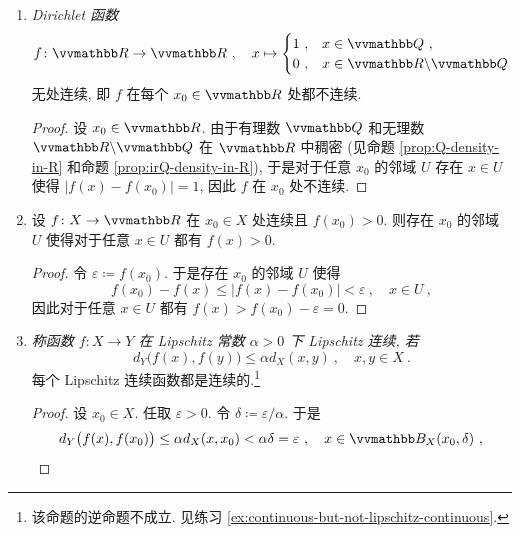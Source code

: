 \begin{example}
\begin{enumerate}
\begin{proof}
            设 \(x_0 \in \Z\). 由于
            \[
                \bigl|\lfloor x \rfloor - \lfloor x_0 \rfloor\bigr| = \lfloor x_0 \rfloor - \lfloor x \rfloor \geq 1\ ,\quad x < x_0\ ,
            \]
            因此对于任意 \(\delta > 0\) 存在 \(x \in (x_0 - \delta, x_0 + \delta)\) 使得 \(\bigl|\lfloor x \rfloor - \lfloor x_0 \rfloor\bigr| \geq 1\). 这说明 \(\lfloor \cdot \rfloor\) 在 \(x_0\) 处不连续.
        \end{proof}
        \item \textsl{Dirichlet 函数
        \[
            f \colon \R \to \R\ ,\quad x \mapsto
            \begin{cases}
                1\ , & x \in \Q\ , \\
                0\ , & x \in \R \backslash \Q
            \end{cases}
        \]
        } 无处连续, 即 \(f\) 在每个 \(x_0 \in \R\) 处都不连续.
        \begin{proof}
            设 \(x_0 \in \R\). 由于有理数 \(\Q\) 和无理数 \(\R \backslash \Q\) 在 \(\R\) 中稠密 (见命题 \ref{prop:Q-density-in-R} 和命题 \ref{prop:irQ-density-in-R}), 于是对于任意 \(x_0\) 的邻域 \(U\) 存在 \(x \in U\) 使得 \(|f(x) - f(x_0)| = 1\), 因此 \(f\) 在 \(x_0\) 处不连续.
        \end{proof}
        \item 设 \(f \colon X \to \R\) 在 \(x_0 \in X\) 处连续且 \(f(x_0) > 0\). 则存在 \(x_0\) 的邻域 \(U\) 使得对于任意 \(x \in U\) 都有 \(f(x) > 0\).
        \begin{proof}
            令 \(\varepsilon \coloneqq f(x_0)\). 于是存在 \(x_0\) 的邻域 \(U\) 使得
            \[
                f(x_0) - f(x) \leq |f(x) - f(x_0)| < \varepsilon\ ,\quad x \in U\ ,
            \]
            因此对于任意 \(x \in U\) 都有 \(f(x) > f(x_0) - \varepsilon = 0\).
        \end{proof}
        \item \textsl{称函数 \(f \colon X \to Y\) 在 Lipschitz 常数 \(\alpha > 0\) 下 Lipschitz 连续, 若
        \[
            d_Y \big(f(x), f(y)\big) \leq \alpha d_X(x, y)\ ,\quad x, y \in X\ .
        \]
        } 每个 Lipschitz 连续函数都是连续的.\footnote{该命题的逆命题不成立. 见练习 \ref{ex:continuous-but-not-lipschitz-continuous}.}
        \begin{proof}
            设 \(x_0 \in X\). 任取 \(\varepsilon > 0\). 令 \(\delta \coloneqq \varepsilon / \alpha\). 于是
            \[
                d_Y \big(f(x), f(x_0)\big) \leq \alpha d_X(x, x_0) < \alpha \delta = \varepsilon\ ,\quad x \in \B_X(x_0, \delta)\ ,
\]
\end{proof}
\end{enumerate}
\end{example}
